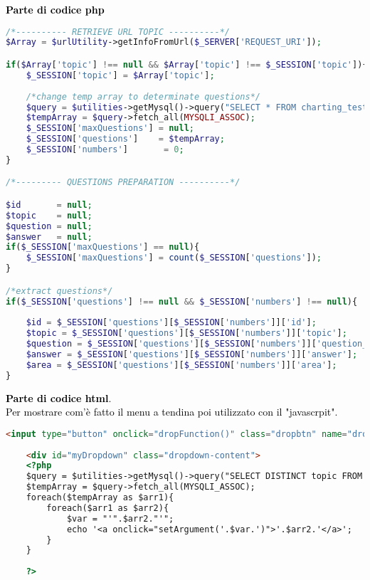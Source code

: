 \textbf{\textcolor{black}{Parte di codice php}}\\

\begin{lstlisting}[language=php]
/*---------- RETRIEVE URL TOPIC ----------*/
$Array = $urlUtility->getInfoFromUrl($_SERVER['REQUEST_URI']);

if($Array['topic'] !== null && $Array['topic'] !== $_SESSION['topic']){
	$_SESSION['topic'] = $Array['topic'];
	
	/*change temp array to determinate questions*/
	$query = $utilities->getMysql()->query("SELECT * FROM charting_test_5d WHERE (topic = '{$Array['topic']}')");
	$tempArray = $query->fetch_all(MYSQLI_ASSOC);
	$_SESSION['maxQuestions'] = null;
	$_SESSION['questions']    = $tempArray;
	$_SESSION['numbers']       = 0;
}

/*--------- QUESTIONS PREPARATION ----------*/

$id       = null;
$topic    = null;
$question = null;
$answer   = null;
if($_SESSION['maxQuestions'] == null){
	$_SESSION['maxQuestions'] = count($_SESSION['questions']);
}

/*extract questions*/
if($_SESSION['questions'] !== null && $_SESSION['numbers'] !== null){
	
	$id = $_SESSION['questions'][$_SESSION['numbers']]['id'];
	$topic = $_SESSION['questions'][$_SESSION['numbers']]['topic'];
	$question = $_SESSION['questions'][$_SESSION['numbers']]['question_text'];
	$answer = $_SESSION['questions'][$_SESSION['numbers']]['answer'];
	$area = $_SESSION['questions'][$_SESSION['numbers']]['area'];	
}
\end{lstlisting}

\textcolor{black}{\textbf{Parte di codice html}. \\Per mostrare com'è fatto il menu a tendina poi utilizzato con il "javascrpit".}\\

\begin{lstlisting}[language=html]
	 <input type="button" onclick="dropFunction()" class="dropbtn" name="dropdown" value="Seleziona capitolo">
	
	<div id="myDropdown" class="dropdown-content">
	<?php
	$query = $utilities->getMysql()->query("SELECT DISTINCT topic FROM charting_test_5d");
	$tempArray = $query->fetch_all(MYSQLI_ASSOC);
	foreach($tempArray as $arr1){
		foreach($arr1 as $arr2){
			$var = "'".$arr2."'";
			echo '<a onclick="setArgument('.$var.')">'.$arr2.'</a>';
		}
	}		
	
	?>			
\end{lstlisting}

